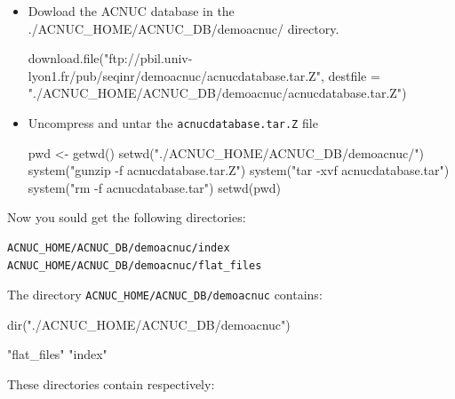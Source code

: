 \documentclass{article}
\begin{document}
\begin{itemize}
\item Dowload the ACNUC database in the ./ACNUC\_HOME/ACNUC\_DB/demoacnuc/ directory.

\begin{Schunk}
\begin{Sinput}
 download.file("ftp://pbil.univ-lyon1.fr/pub/seqinr/demoacnuc/acnucdatabase.tar.Z",
 destfile = "./ACNUC_HOME/ACNUC_DB/demoacnuc/acnucdatabase.tar.Z")
\end{Sinput}
\end{Schunk}


\item Uncompress and untar the \texttt{acnucdatabase.tar.Z} file 

\begin{Schunk}
\begin{Sinput}
 pwd <- getwd()
 setwd("./ACNUC_HOME/ACNUC_DB/demoacnuc/")
 system("gunzip -f acnucdatabase.tar.Z")
 system("tar -xvf acnucdatabase.tar")
 system("rm -f acnucdatabase.tar")
 setwd(pwd)
\end{Sinput}
\end{Schunk}

\end{itemize}
Now you sould get the following directories:
\begin{verbatim}
ACNUC_HOME/ACNUC_DB/demoacnuc/index
ACNUC_HOME/ACNUC_DB/demoacnuc/flat_files
\end{verbatim}

The directory \texttt{ACNUC\_HOME/ACNUC\_DB/demoacnuc} contains: 
\begin{Schunk}
\begin{Sinput}
 dir("./ACNUC_HOME/ACNUC_DB/demoacnuc")
\end{Sinput}
\begin{Soutput}
[1] "flat_files" "index"     
\end{Soutput}
\end{Schunk}

These directories contain respectively:
\end{document}
